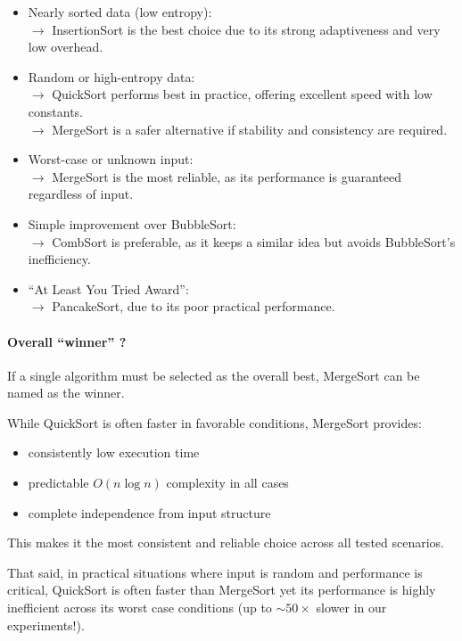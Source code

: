 \documentclass{article}
\begin{document}
\begin{itemize}
    \item Nearly sorted data (low entropy):\\
    $\rightarrow$ InsertionSort is the best choice due to its strong adaptiveness and very low overhead.

    \item Random or high-entropy data: \\
 $\rightarrow$ QuickSort performs best in practice, offering excellent speed with low constants. \\
 $\rightarrow$ MergeSort is a safer alternative if stability and consistency are required.

    \item Worst-case or unknown input: \\
 $\rightarrow$ MergeSort is the most reliable, as its performance is guaranteed regardless of input.

    \item Simple improvement over BubbleSort:\\
$\rightarrow$ CombSort is preferable, as it keeps a similar idea but avoids BubbleSort's inefficiency.

    \item ``At Least You Tried Award'':\\
$\rightarrow$ PancakeSort, due to its poor practical performance.
\end{itemize}

\paragraph{Overall ``winner'' ?}

If a single algorithm must be selected as the overall best, MergeSort can be named as the winner.

While QuickSort is often faster in favorable conditions, MergeSort provides:
\begin{itemize}
    \item consistently low execution time
    \item predictable $O(n \log n)$ complexity in all cases
    \item complete independence from input structure
\end{itemize}

This makes it the most consistent and reliable choice across all tested scenarios.

That said, in practical situations where input is random and performance is critical, QuickSort is often faster than MergeSort yet its performance is highly inefficient across its worst case conditions (up to $\sim 50\times$ slower in our experiments!).
\end{document}
